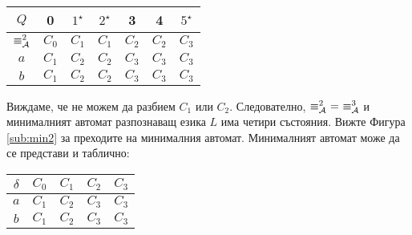 \begin{example}
\begin{itemize}
      \begin{tabular}{|c|c|c|c|c|c|c|}
        \hline
        $Q$ & 0 & $1^\star$ & $2^\star$ & 3 & 4 & $5^\star$ \\
        \hline
        \hline
        $\equiv^2_{\mathcal{A}}$ & $C_0$ & $C_1$ & $C_1$ & $C_2$ & $C_2$ & $C_3$\\
        \hline
        $a$ & $C_1$ & $C_2$ & $C_2$ & $C_3$ & $C_3$ & $C_3$\\
        \hline
        $b$ & $C_1$ & $C_2$ & $C_2$ & $C_3$ & $C_3$ & $C_3$\\
        \hline
      \end{tabular}
      
      Виждаме, че не можем да разбием $C_1$ или $C_2$.
      Следователно, $\equiv^2_\A\ =\ \equiv^3_\A$ и минималният автомат разпознаващ езика $L$
      има четири състояния. Вижте Фигура \ref{sub:min2} за преходите на минималния автомат.
      Минималният автомат може да се представи и таблично:

      \begin{tabular}{|c|c|c|c|c|}
        \hline
        $\delta$ & $C_0$ & $C_1$ & $C_2$ & $C_3$ \\
        \hline
        $a$ & $C_1$ & $C_2$ & $C_3$ & $C_3$ \\
        \hline
        $b$ & $C_1$ & $C_2$ & $C_3$ & $C_3$ \\
        \hline
      \end{tabular}
      
  \end{itemize}
\end{example}


